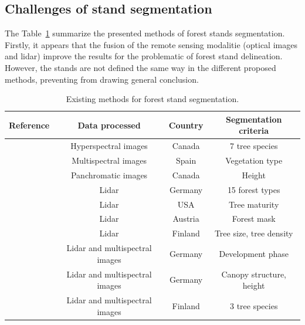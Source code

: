 \subsection{Challenges of stand segmentation}
The Table~\ref{table:methods} summarize the presented methods of forest stands segmentation. Firstly, it appears that the fusion of the remote sensing modalitie (optical images and lidar) improve the results for the problematic of forest stand delineation. However, the stands are not defined the same way in the different proposed methods, preventing from drawing general conclusion.
\begin{table}
\begin{center}
\begin{tabular}{|l|c|c|c|}
\hline
Reference & Data processed & Country & Segmentation criteria \\
\hline
\cite{leckie2003stand} & Hyperspectral images & Canada & 7 tree species \\
\hline
\cite{hernando2012spatial} & Multispectral images & Spain & Vegetation type \\
\hline
\cite{Mora20102474} & Panchromatic images & Canada & Height \\
\hline
\cite{koch2009airborne} & Lidar & Germany & 15 forest types \\
\hline
\cite{sullivan2009object} & Lidar & USA & Tree maturity \\
\hline
\cite{eysn2012forest} & Lidar &  Austria & Forest mask \\
\hline
\cite{wu2014data} & Lidar & Finland & Tree size, tree density \\
\hline
\cite{tiede2004object} & Lidar and multispectral images & Germany & Development phase \\
\hline
\cite{diedershagen2004automatic} & Lidar and multispectral images & Germany & Canopy structure, height \\
\hline
\cite{leppanen2008automatic} & Lidar and multispectral images & Finland & 3 tree species \\
\hline
\end{tabular}
\caption{Existing methods for forest stand segmentation.}
\label{table:methods}
\end{center}
\end{table}

